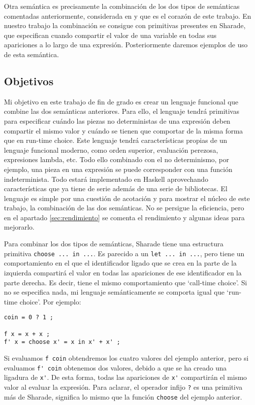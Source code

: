 \documentclass[class=article, crop=false]{standalone}
\begin{document}
Otra semántica es precisamente la combinación de los dos tipos de semánticas comentadas
anteriormente, considerada en \cite{riesco2014singular} y que es el corazón de este trabajo.
En nuestro trabajo la combinación se consigue con primitivas presentes en Sharade, que
especifican cuando compartir el valor de una variable en todas sus apariciones a lo largo de
una expresión. Posteriormente daremos ejemplos de uso de esta semántica.

\subsection{Objetivos}
Mi objetivo en este trabajo de fin de grado es crear un lenguaje funcional que combine las
dos semánticas anteriores. Para ello, el lenguaje tendrá primitivas para especificar cuándo
las piezas no deterministas de una expresión deben compartir el mismo valor y cuándo se
tienen que comportar de la misma forma que en run-time choice. Este lenguaje tendrá
características propias de un lenguaje funcional moderno, como orden superior, evaluación
perezosa, expresiones lambda, etc. Todo ello combinado con el no determinismo, por ejemplo,
una pieza en una expresión se puede corresponder con una función indeterminista. Todo estará
implementado en Haskell aprovechando características que ya tiene de serie además de una
serie de bibliotecas. El lenguaje es simple por una cuestión de acotación y para mostrar el
núcleo de este trabajo, la combinación de las dos semánticas. No se persigue la eficiencia,
pero en el apartado \ref{sec:rendimiento} se comenta el rendimiento y algunas ideas para
mejorarlo.

Para combinar los dos tipos de semánticas, Sharade tiene una estructura primitiva
\verb`choose ... in ...`. Es parecido a un \verb`let ... in ...`, pero tiene un
comportamiento en el que el identificador ligado que se crea en la parte de la izquierda
compartirá el valor en todas las apariciones de ese identificador en la parte derecha. Es
decir, tiene el mismo comportamiento que `call-time choice'. Si no se especifica nada, mi
lenguaje semánticamente se comporta igual que `run-time choice'. Por ejemplo:

\begin{verbatim}
coin = 0 ? 1 ;

f x = x + x ;
f' x = choose x' = x in x' + x' ;
\end{verbatim}

Si evaluamos \verb`f coin` obtendremos los cuatro valores del ejemplo anterior, pero si
evaluamos \verb`f' coin` obtenemos dos valores, debido a que se ha creado una ligadura de
\verb`x'`. De esta forma, todas las apariciones de \verb`x'` compartirán el mismo valor al
evaluar la expresión. Para aclarar, el operador infijo \verb`?` es una primitiva más de
Sharade, significa lo mismo que la función \verb`choose` del ejemplo anterior.
\end{document}

